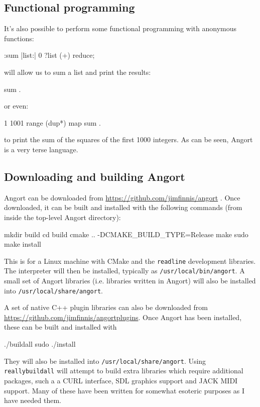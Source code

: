 \subsection{Functional programming}
It's also possible to perform some functional programming with
anonymous functions:
\begin{v}
:sum |list:| 0 ?list (+) reduce;
\end{v}
will allow us to sum a list and print the results:
\begin{v}
[1,2,3,4,5] sum .
\end{v}
or even:
\begin{v}
1 1001 range (dup*) map sum .
\end{v}
to print the sum of the squares of the first 1000 integers.
As can be seen, Angort is a very terse language.

\subsection{Downloading and building Angort}
Angort can be downloaded from \url{https://github.com/jimfinnis/angort} .
Once downloaded, it can be built and installed 
with the following commands (from
inside the top-level Angort directory):
\begin{v}
mkdir build
cd build
cmake .. -DCMAKE_BUILD_TYPE=Release
make
sudo make install
\end{v}
This is for a Linux machine
with CMake and the \texttt{readline} development libraries. The
interpreter will then be installed, typically as \texttt{/usr/local/bin/angort}. 
A small set of Angort libraries (i.e. libraries written in Angort) will also be installed
into \texttt{/usr/local/share/angort}.

A set
of native C++ plugin libraries can also be downloaded from
\url{https://github.com/jimfinnis/angortplugins}. Once Angort has
been installed, these can be built and installed with
\begin{v}
./buildall
sudo ./install
\end{v}
They will also be installed into \texttt{/usr/local/share/angort}.
Using \texttt{reallybuildall} will attempt to build extra libraries
which require additional packages, such a a CURL interface, SDL
graphics support and JACK MIDI support. Many of these have been written for
somewhat esoteric purposes as I have needed them.


